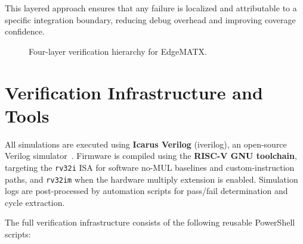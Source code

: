 ﻿\documentclass[12pt,a4paper]{report}
\begin{document}
This layered approach ensures that any failure is localized and attributable to a specific integration boundary, reducing debug overhead and improving coverage confidence.

\begin{figure}[H]
\centering
{}
\caption{Four-layer verification hierarchy for EdgeMATX.}
\label{fig:verif_hierarchy}
\end{figure}

\section{Verification Infrastructure and Tools}

All simulations are executed using \textbf{Icarus Verilog} (iverilog), an open-source Verilog simulator~\cite{williams_icarus_verilog}.
Firmware is compiled using the \textbf{RISC-V GNU toolchain}, targeting the \texttt{rv32i} ISA for software no-MUL baselines and custom-instruction paths, and \texttt{rv32im} when the hardware multiply extension is enabled.
Simulation logs are post-processed by automation scripts for pass/fail determination and cycle extraction.

The full verification infrastructure consists of the following reusable PowerShell scripts:
\end{document}
